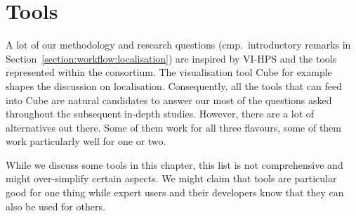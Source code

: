 \chapter{Tools}
\label{chapter:tools}

A lot of our methodology and research questions (cmp.~introductory remarks in
Section~\ref{section:workflow:localisation}) are inspired by VI-HPS and the tools
represented within the consortium.
The visualisation tool Cube \cite{geimer2007} for example shapes the discussion on
localisation.
Consequently, all the tools that can feed into Cube are natural candidates to
answer our most of the questions asked throughout the subsequent in-depth
studies.
However, there are a lot of alternatives out there.
Some of them work for all three flavours, some of them work particularly well
for one or two.


While we discuss some tools in this chapter, this list is not comprehensive and
might over-simplify certain aspects.
We might claim that tools are particular good for one thing while expert users
and their developers know that they can also be used for others.


